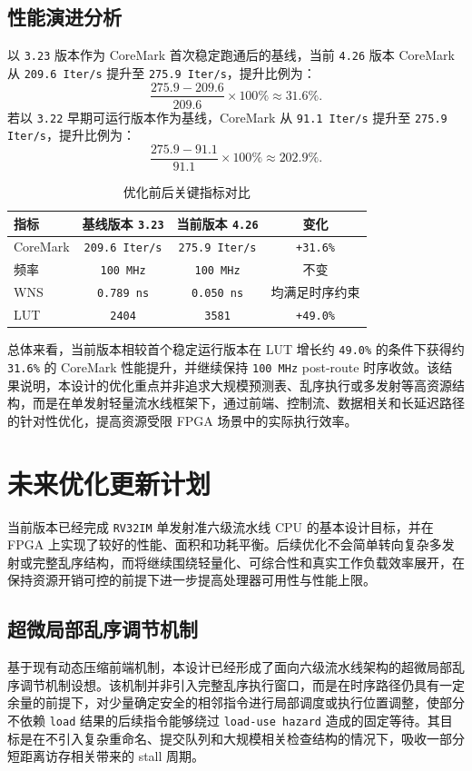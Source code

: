 ﻿\documentclass[12pt,a4paper]{ctexart}
\begin{document}
\subsection{性能演进分析}
以 \texttt{3.23} 版本作为 CoreMark 首次稳定跑通后的基线，当前 \texttt{4.26} 版本 CoreMark 从 \texttt{209.6 Iter/s} 提升至 \texttt{275.9 Iter/s}，提升比例为：
\[
    \frac{275.9-209.6}{209.6}\times100\% \approx 31.6\%.
\]
若以 \texttt{3.22} 早期可运行版本作为基线，CoreMark 从 \texttt{91.1 Iter/s} 提升至 \texttt{275.9 Iter/s}，提升比例为：
\[
    \frac{275.9-91.1}{91.1}\times100\% \approx 202.9\%.
\]

\begin{table}[H]
    \centering
    \caption{优化前后关键指标对比}
    \label{tab:history_perf_compare}
    \begin{tabularx}{\textwidth}{lccc}
        \toprule
        指标 & 基线版本 \texttt{3.23} & 当前版本 \texttt{4.26} & 变化 \\
        \midrule
        CoreMark & \texttt{209.6 Iter/s} & \texttt{275.9 Iter/s} & \texttt{+31.6\%} \\
        频率 & \texttt{100 MHz} & \texttt{100 MHz} & 不变 \\
        WNS & \texttt{0.789 ns} & \texttt{0.050 ns} & 均满足时序约束 \\
        LUT & \texttt{2404} & \texttt{3581} & \texttt{+49.0\%} \\
        \bottomrule
    \end{tabularx}
\end{table}

总体来看，当前版本相较首个稳定运行版本在 LUT 增长约 \texttt{49.0\%} 的条件下获得约 \texttt{31.6\%} 的 CoreMark 性能提升，并继续保持 \texttt{100 MHz} post-route 时序收敛。该结果说明，本设计的优化重点并非追求大规模预测表、乱序执行或多发射等高资源结构，而是在单发射轻量流水线框架下，通过前端、控制流、数据相关和长延迟路径的针对性优化，提高资源受限 FPGA 场景中的实际执行效率。

\section{未来优化更新计划}

当前版本已经完成 \texttt{RV32IM} 单发射准六级流水线 CPU 的基本设计目标，并在 FPGA 上实现了较好的性能、面积和功耗平衡。后续优化不会简单转向复杂多发射或完整乱序结构，而将继续围绕轻量化、可综合性和真实工作负载效率展开，在保持资源开销可控的前提下进一步提高处理器可用性与性能上限。

\subsection{超微局部乱序调节机制}
基于现有动态压缩前端机制，本设计已经形成了面向六级流水线架构的超微局部乱序调节机制设想。该机制并非引入完整乱序执行窗口，而是在时序路径仍具有一定余量的前提下，对少量确定安全的相邻指令进行局部调度或执行位置调整，使部分不依赖 \texttt{load} 结果的后续指令能够绕过 \texttt{load-use hazard} 造成的固定等待。其目标是在不引入复杂重命名、提交队列和大规模相关检查结构的情况下，吸收一部分短距离访存相关带来的 stall 周期。
\end{document}
